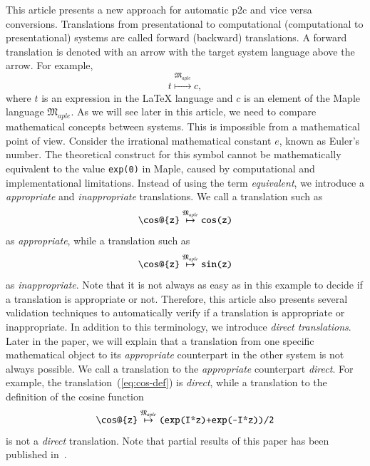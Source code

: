 \documentclass[a4paper,11pt]{article}
\newcommand{\Maple}{Maple}
\newcommand{\langMaple}{\mathfrak{M}_{aple}}
\theoremstyle{defTheoStyle}
\theoremstyle{defExampStyle}
\begin{document}
This article presents a new approach for automatic \gls*{p2c} and vice versa conversions. Translations from presentational to computational (computational to presentational) systems are called forward (backward) translations. A forward translation is denoted with an arrow with the target system language above the arrow. For example,
\begin{equation*}
t \overset{\langMaple}{\mapsto} c,
\end{equation*}
where $t$ is an expression in the \LaTeX{} language and $c$ is an element of the \Maple{} language $\langMaple$. As we will see later in this article, we need to compare mathematical concepts between systems. This is impossible from a mathematical point of view. Consider the irrational mathematical constant $e$, known as Euler's number. The theoretical construct for this symbol cannot be mathematically equivalent to the value \verb|exp(0)| in \Maple, caused by computational and implementational limitations. Instead of using the term \textit{equivalent}, we introduce a \textit{appropriate} and \textit{inappropriate} translations. We call a translation such as
\begin{equation}\label{eq:cos-def}
\verb|\cos@{z}| \overset{\langMaple}{\mapsto} \verb|cos(z)|
\end{equation}
as \textit{appropriate}, while a translation such as
\begin{equation}
\verb|\cos@{z}| \overset{\langMaple}{\mapsto} \verb|sin(z)|
\end{equation}
as \textit{inappropriate}. Note that it is not always as easy as in this example to decide if a translation is appropriate or not. Therefore, this article also presents several validation techniques to automatically verify if a translation is appropriate or inappropriate. In addition to this terminology, we introduce \textit{direct translations}. Later in the paper, we will explain that a translation from one specific mathematical object to its \textit{appropriate} counterpart in the other system is not always possible. We call a translation to the \textit{appropriate} counterpart \textit{direct}. For example, the translation~(\ref{eq:cos-def}) is \textit{direct}, while a translation to the definition of the cosine function
\begin{equation*}
\verb|\cos@{z}| \overset{\langMaple}{\mapsto} \verb|(exp(I*z)+exp(-I*z))/2|
\end{equation*}
is not a \textit{direct} translation.
Note that partial results of this paper has been published in~\parencite{CICM:Paper}.
 
\end{document}
